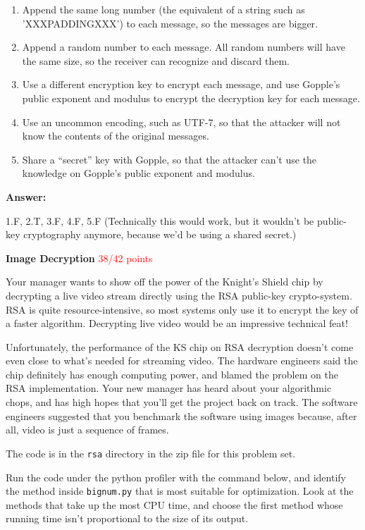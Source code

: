 \documentclass[12pt,twoside]{article}
\newcommand{\answer}{
 \par\medskip
 \textbf{Answer:}
}
\newcommand{\answerIIf}{ \answer
1.F, 2.T, 3.F, 4.F, 5.F (Technically this would work, but it wouldn't be
public-key cryptography anymore, because we'd be using a shared secret.)
}
\begin{document}
\begin{problems}
\begin {problemparts}
\begin{enumerate}
  \item Append the same long number (the equivalent of a string such as
  'XXXPADDINGXXX') to each message, so the messages are bigger.
  \item Append a random number to each message. All random numbers will have the
  same size, so the receiver can recognize and discard them.
  \item Use a different encryption key to encrypt each message, and use Gopple's
  public exponent and modulus to encrypt the decryption key for each message.
  \item Use an uncommon encoding, such as UTF-7, so that the attacker will not
  know the contents of the original messages.
  \item Share a ``secret'' key with Gopple, so that the attacker can't use the
  knowledge on Gopple's public exponent and modulus.
\end{enumerate}
\answerIIf

\end{problemparts}

\newpage

\problem {} \textbf{Image Decryption} \textcolor{red}{38/42 points}

Your manager wants to show off the power of the Knight's Shield chip by
decrypting a live video stream directly using the RSA public-key crypto-system.
RSA is quite resource-intensive, so most systems only use it to encrypt the key
of a faster algorithm. Decrypting live video would be an impressive technical
feat!

Unfortunately, the performance of the KS chip on RSA decryption doesn't come
even close to what's needed for streaming video. The hardware engineers said the
chip definitely has enough computing power, and blamed the problem on the
RSA implementation. Your new manager has heard about your algorithmic chops, and
has high hopes that you'll get the project back on track. The software engineers
suggested that you benchmark the software using images because, after all, video
is just a sequence of frames.

The code is in the \texttt{rsa} directory in the zip file for this problem set.

\begin{problemparts}
\problempart {} Run the code under the python profiler with the command
below, and identify the method inside \texttt{bignum.py} that is most suitable
for optimization. Look at the methods that take up the most CPU time, and
choose the first method whose running time isn't proportional to the size of its
output.


\end{problemparts}
\end{problems}
\end{document}
